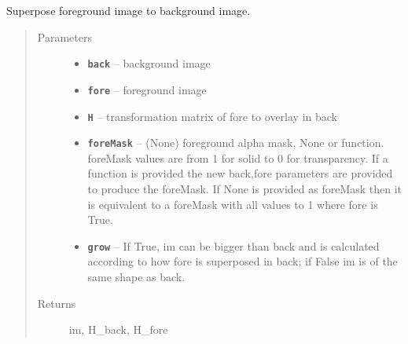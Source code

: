 \documentclass[letterpaper,10pt,english]{sphinxmanual}
\begin{document}
\begin{fulllineitems}
\label{RRtoolbox.lib.arrayops:RRtoolbox.lib.arrayops.basic.superpose}
Superpose foreground image to background image.
\begin{quote}\begin{description}
\item[{Parameters}] \leavevmode\begin{itemize}
\item {} 
\textbf{\texttt{back}} -- background image

\item {} 
\textbf{\texttt{fore}} -- foreground image

\item {} 
\textbf{\texttt{H}} -- transformation matrix of fore to overlay in back

\item {} 
\textbf{\texttt{foreMask}} -- (None) foreground alpha mask, None or function.
foreMask values are from 1 for solid to 0 for transparency.
If a function is provided the new back,fore parameters are
provided to produce the foreMask. If None is provided
as foreMask then it is equivalent to a foreMask with all
values to 1 where fore is True.

\item {} 
\textbf{\texttt{grow}} -- If True, im can be bigger than back and is calculated
according to how fore is superposed in back; if False
im is of the same shape as back.

\end{itemize}

\item[{Returns}] \leavevmode
im, H\_back, H\_fore

\end{description}\end{quote}

\end{fulllineitems}

\end{document}
